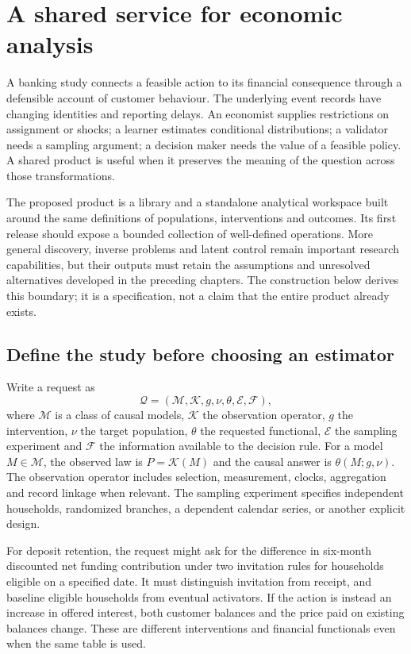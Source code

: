 \chapter{A shared service for economic analysis}
\label{r3:product}

A banking study connects a feasible action to its financial consequence
through a defensible account of customer behaviour. The underlying event
records have changing identities and reporting delays. An economist supplies restrictions on
assignment or shocks; a learner estimates conditional distributions; a
validator needs a sampling argument; a decision maker needs the value of
a feasible policy. A shared product is useful when it preserves the
meaning of the question across those transformations.

The proposed product is a library and a standalone analytical workspace
built around the same definitions of populations, interventions and outcomes. Its first release should expose
a bounded collection of well-defined operations. More general discovery,
inverse problems and latent control remain important research capabilities,
but their outputs must retain the assumptions and unresolved alternatives
developed in the preceding chapters. The construction below derives this
boundary; it is a specification, not a claim that the entire product
already exists.

\section{Define the study before choosing an estimator}
\label{r3:request-type}

Write a request as
\begin{equation}
 \mathcal Q=(\mathcal M,\mathcal K,g,\nu,\theta,\mathcal E,\mathcal F),
 \label{r3:request}
\end{equation}
where $\mathcal M$ is a class of causal models, $\mathcal K$ the observation
operator, $g$ the intervention, $\nu$ the target population, $\theta$
the requested functional, $\mathcal E$ the sampling experiment and
$\mathcal F$ the information available to the decision rule. For a model
$M\in\mathcal M$, the observed law is $P=\mathcal K(M)$ and the causal
answer is $\theta(M;g,\nu)$. The observation operator includes selection,
measurement, clocks, aggregation and record linkage when relevant.
The sampling experiment specifies independent households, randomized
branches, a dependent calendar series, or another explicit design.

For deposit retention, the request might ask for the difference in
six-month discounted net funding contribution under two invitation
rules for households eligible on a specified date. It must distinguish
invitation from receipt, and baseline eligible households from eventual
activators. If the action is instead an increase in offered interest,
both customer balances and the price paid on existing balances change.
These are different interventions and financial functionals even when
the same table is used.

